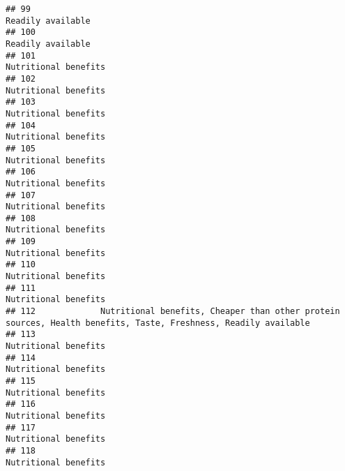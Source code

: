 \documentclass[
]{article}
\begin{document}
\begin{verbatim}
## 99                                                                                                           Readily available
## 100                                                                                                          Readily available
## 101                                                                                                       Nutritional benefits
## 102                                                                                                       Nutritional benefits
## 103                                                                                                       Nutritional benefits
## 104                                                                                                       Nutritional benefits
## 105                                                                                                       Nutritional benefits
## 106                                                                                                       Nutritional benefits
## 107                                                                                                       Nutritional benefits
## 108                                                                                                       Nutritional benefits
## 109                                                                                                       Nutritional benefits
## 110                                                                                                       Nutritional benefits
## 111                                                                                                       Nutritional benefits
## 112             Nutritional benefits, Cheaper than other protein sources, Health benefits, Taste, Freshness, Readily available
## 113                                                                                                       Nutritional benefits
## 114                                                                                                       Nutritional benefits
## 115                                                                                                       Nutritional benefits
## 116                                                                                                       Nutritional benefits
## 117                                                                                                       Nutritional benefits
## 118                                                                                                       Nutritional benefits

\end{verbatim}
\end{document}
